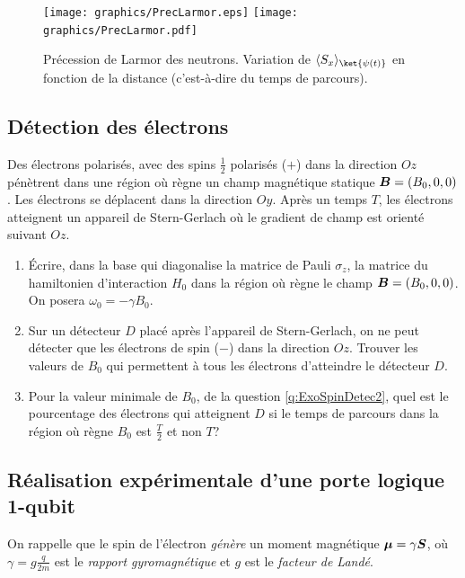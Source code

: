\begin{figure}[ptbh]
\centering
\ifcase\msipdfoutput
	\texttt{[image: graphics/PrecLarmor.eps]}
\else
	\texttt{[image: graphics/PrecLarmor.pdf]}
\fi
\caption{Précession de Larmor des neutrons. Variation de $\langle
S_{x}\rangle _{\ket{\psi(t)}}$ en fonction de la
distance (c'est-à-dire du temps de parcours).}%
\label{fig:PrecLarmor}%
\end{figure}

\subsection{Détection des électrons}

Des électrons polarisés, avec des spins $\frac{1}{2}$ polarisés ($+$) dans la
direction $Oz$ pénètrent dans une région où règne un champ magnétique statique
$\boldsymbol{B}=(B_0,0,0)$. Les électrons se déplacent dans la direction $Oy$.
Après un temps $T$, les électrons atteignent un appareil de Stern-Gerlach où le
gradient de champ est orienté suivant $Oz$.

\begin{enumerate}
\item Écrire, dans la base qui diagonalise la matrice de Pauli $\sigma_z$, la
matrice du hamiltonien d'interaction $H_0$ dans la région où règne le champ
$\boldsymbol{B}=(B_0,0,0)$. On posera $\omega _0=-\gamma B_0$.

\item \label{q:ExoSpinDetec2}Sur un détecteur $D$ placé après l'appareil de
Stern-Gerlach, on ne peut détecter que les électrons de spin ($-$) dans la
direction $Oz$. Trouver les valeurs de $B_0$ qui permettent à tous les
électrons d'atteindre le détecteur $D$.

\item Pour la valeur minimale de $B_0$, de la question \ref{q:ExoSpinDetec2}, 
quel est le pourcentage des électrons qui atteignent $D$ si le temps de parcours 
dans la région où règne $B_0$ est $\frac{T}{2}$ et non $T$?
\end{enumerate}


\subsection{Réalisation expérimentale d'une porte logique 1-qubit}

On rappelle que le spin de l'électron \emph{génère} un moment magnétique
$\boldsymbol{\mu}=\gamma\boldsymbol{S}$, où $\gamma=g\frac{q}{2m}$ est le \emph{rapport
gyromagnétique} et $g$ est le \emph{facteur de Landé}.

